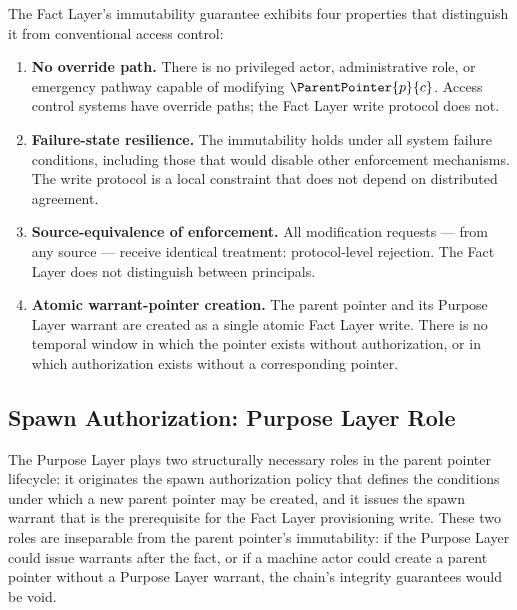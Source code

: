 The Fact Layer's immutability guarantee exhibits four properties that distinguish it from conventional access control:

\begin{enumerate}
    \item[(E1)] \textbf{No override path.} There is no privileged actor, administrative role, or emergency pathway capable of modifying $\ParentPointer{p}{c}$. Access control systems have override paths; the Fact Layer write protocol does not.

    \item[(E2)] \textbf{Failure-state resilience.} The immutability holds under all system failure conditions, including those that would disable other enforcement mechanisms. The write protocol is a local constraint that does not depend on distributed agreement.

    \item[(E3)] \textbf{Source-equivalence of enforcement.} All modification requests --- from any source --- receive identical treatment: protocol-level rejection. The Fact Layer does not distinguish between principals.

    \item[(E4)] \textbf{Atomic warrant-pointer creation.} The parent pointer and its Purpose Layer warrant are created as a single atomic Fact Layer write. There is no temporal window in which the pointer exists without authorization, or in which authorization exists without a corresponding pointer.
\end{enumerate}

\subsection{Spawn Authorization: Purpose Layer Role}
\label{sec:purpose-layer-spawn-authorization}

The Purpose Layer plays two structurally necessary roles in the parent pointer lifecycle: it originates the spawn authorization policy that defines the conditions under which a new parent pointer may be created, and it issues the spawn warrant that is the prerequisite for the Fact Layer provisioning write. These two roles are inseparable from the parent pointer's immutability: if the Purpose Layer could issue warrants after the fact, or if a machine actor could create a parent pointer without a Purpose Layer warrant, the chain's integrity guarantees would be void.


